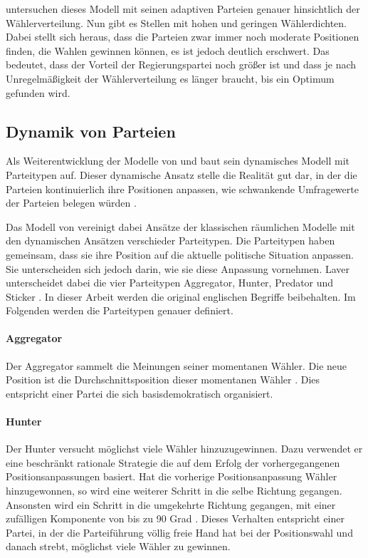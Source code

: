 \citet{kollman1998political} untersuchen dieses Modell mit seinen adaptiven Parteien genauer hinsichtlich der Wählerverteilung. Nun gibt es Stellen mit hohen und geringen Wählerdichten. Dabei stellt sich heraus, dass die Parteien zwar immer noch moderate Positionen finden, die Wahlen gewinnen können, es ist jedoch deutlich erschwert. Das bedeutet, dass der Vorteil der Regierungspartei noch größer ist und dass je nach Unregelmäßigkeit der Wählerverteilung es länger braucht, bis ein Optimum gefunden wird. \citep{kollman1998political}

\subsection{Dynamik von Parteien} \label{sec:ABM-Dynamik}

Als Weiterentwicklung der Modelle von \citet{kollman1992adaptive} und \citet{kollman1998political} baut \citet{laver2005policy} sein dynamisches Modell mit Parteitypen auf.
Dieser dynamische Ansatz stelle die Realität gut dar, in der die Parteien kontinuierlich ihre Positionen anpassen, wie schwankende Umfragewerte der Parteien belegen würden \citep[S.\,263-4]{laver2005policy}.

Das Modell von \citet{laver2005policy} vereinigt dabei Ansätze der klassischen räumlichen Modelle mit den dynamischen Ansätzen verschieder Parteitypen. Die Parteitypen haben gemeinsam, dass sie ihre Position auf die aktuelle politische Situation anpassen. Sie unterscheiden sich jedoch darin, wie sie diese Anpassung vornehmen. Laver unterscheidet dabei die vier Parteitypen Aggregator, Hunter, Predator und Sticker \citep[S.\,266-7]{laver2005policy}. In dieser Arbeit werden die original englischen Begriffe beibehalten. Im Folgenden werden die Parteitypen genauer definiert.

\paragraph{Aggregator} Der Aggregator sammelt die Meinungen seiner momentanen Wähler. Die neue Position ist die Durchschnittsposition dieser momentanen Wähler \citep[S.\,267]{laver2005policy}. Dies entspricht einer Partei die sich basisdemokratisch organisiert.

\paragraph{Hunter} Der Hunter versucht möglichst viele Wähler hinzuzugewinnen. Dazu verwendet er eine beschränkt rationale Strategie die auf dem Erfolg der vorhergegangenen Positionsanpassungen basiert. Hat die vorherige Positionsanpassung Wähler hinzugewonnen, so wird eine weiterer Schritt in die selbe Richtung gegangen. Ansonsten wird ein Schritt in die umgekehrte Richtung gegangen, mit einer zufälligen Komponente von bis zu 90 Grad \citep[S.\,267]{laver2005policy}. Dieses Verhalten entspricht einer Partei, in der die Parteiführung völlig freie Hand hat bei der Positionswahl und danach strebt, möglichst viele Wähler zu gewinnen.

